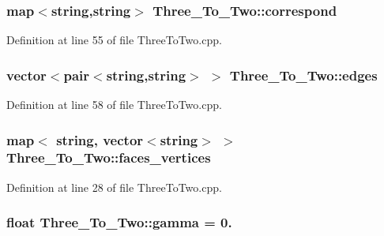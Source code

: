 \subsubsection[{\texorpdfstring{correspond}{correspond}}]{\setlength{\rightskip}{0pt plus 5cm}map$<$string,string$>$ Three\+\_\+\+To\+\_\+\+Two\+::correspond}\hypertarget{class_three___to___two_a98ab641ba7f2da5fffbe0066debcafaa}{}\label{class_three___to___two_a98ab641ba7f2da5fffbe0066debcafaa}


Definition at line 55 of file Three\+To\+Two.\+cpp.

\subsubsection[{\texorpdfstring{edges}{edges}}]{\setlength{\rightskip}{0pt plus 5cm}vector$<$pair$<$string,string$>$ $>$ Three\+\_\+\+To\+\_\+\+Two\+::edges}\hypertarget{class_three___to___two_aafa5fc739b2313e58a440d9b8b3d4875}{}\label{class_three___to___two_aafa5fc739b2313e58a440d9b8b3d4875}


Definition at line 58 of file Three\+To\+Two.\+cpp.

\subsubsection[{\texorpdfstring{faces\+\_\+vertices}{faces_vertices}}]{\setlength{\rightskip}{0pt plus 5cm}map$<$ string, vector$<$string$>$ $>$ Three\+\_\+\+To\+\_\+\+Two\+::faces\+\_\+vertices}\hypertarget{class_three___to___two_a2f86f24e2cbd6f19b7288c3b0f401f49}{}\label{class_three___to___two_a2f86f24e2cbd6f19b7288c3b0f401f49}


Definition at line 28 of file Three\+To\+Two.\+cpp.

\subsubsection[{\texorpdfstring{gamma}{gamma}}]{\setlength{\rightskip}{0pt plus 5cm}float Three\+\_\+\+To\+\_\+\+Two\+::gamma = 0.}\hypertarget{class_three___to___two_aefe3e71b2a022c70407771625a5b416e}{}\label{class_three___to___two_aefe3e71b2a022c70407771625a5b416e}


